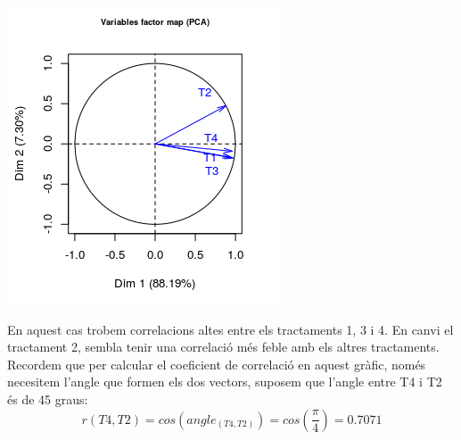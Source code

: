 \documentclass[english]{article}
\begin{document}
\begin{center}
\includegraphics[scale=0.6]{biplotj.png}
\end{center}
En aquest cas trobem correlacions altes entre els tractaments 1, 3 i 4. En canvi el tractament 2, sembla tenir una correlació més feble amb els altres tractaments. Recordem que per calcular el coeficient de correlació en aquest gràfic, només necesitem l'angle que formen els dos vectors, suposem que l'angle entre T4 i T2 és de 45 graus:
\begin{equation*}
r(T4,T2)= cos(angle_{(T4,T2)})= cos(\frac{\pi}{4})= 0.7071
\end{equation*}
\end{document}
